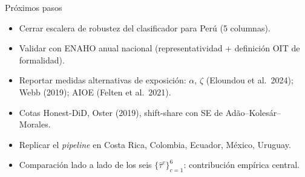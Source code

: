 \documentclass[aspectratio=169,11pt]{beamer}
\newcommand{\cit}[1]{\textcolor{pgray}{\small(#1)}}
\begin{document}
\begin{frame}{Próximos pasos}
\small
\vspace{0.1em}
\begin{itemize}
  \item Cerrar escalera de robustez del clasificador para Perú (5 columnas).
  \item Validar con ENAHO anual nacional (representatividad + definición OIT de formalidad).
  \item Reportar medidas alternativas de exposición: $\alpha$, $\zeta$ \cit{Eloundou et al.\ 2024}; Webb \cit{2019}; AIOE \cit{Felten et al.\ 2021}.
  \item Cotas Honest-DiD, Oster \cit{2019}, shift-share con SE de Adão--Kolesár--Morales.

\vspace{0.3em}
  \item Replicar el \emph{pipeline} en Costa Rica, Colombia, Ecuador, México, Uruguay.
  \item Comparación lado a lado de los seis $\{\hat\tau^c\}_{c=1}^{6}$: contribución empírica central.

\end{itemize}
\end{frame}
\end{document}
